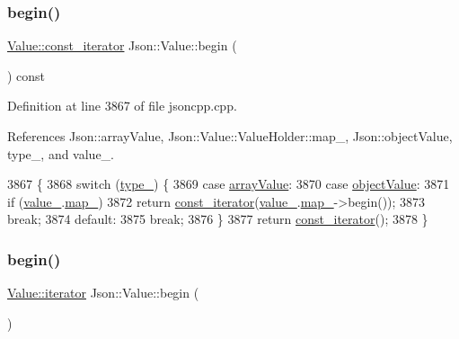 \subsubsection{\texorpdfstring{begin()}{begin()}\hspace{0.1cm}{\footnotesize\ttfamily [1/2]}}
{\footnotesize\ttfamily \hyperlink{class_json_1_1_value_af92282ca92b58b320debd486afb7696a}{Value\+::const\+\_\+iterator} Json\+::\+Value\+::begin (\begin{DoxyParamCaption}{ }\end{DoxyParamCaption}) const}



Definition at line 3867 of file jsoncpp.\+cpp.



References Json\+::array\+Value, Json\+::\+Value\+::\+Value\+Holder\+::map\+\_\+, Json\+::object\+Value, type\+\_\+, and value\+\_\+.


\begin{DoxyCode}
3867                                        \{
3868   \textcolor{keywordflow}{switch} (\hyperlink{class_json_1_1_value_abd222c2536dc88bf330dedcd076d2356}{type\_}) \{
3869   \textcolor{keywordflow}{case} \hyperlink{namespace_json_a7d654b75c16a57007925868e38212b4eadc8f264f36b55b063c78126b335415f4}{arrayValue}:
3870   \textcolor{keywordflow}{case} \hyperlink{namespace_json_a7d654b75c16a57007925868e38212b4eae8386dcfc36d1ae897745f7b4f77a1f6}{objectValue}:
3871     \textcolor{keywordflow}{if} (\hyperlink{class_json_1_1_value_aef578244546212705b9f81eb84d7e151}{value\_}.\hyperlink{union_json_1_1_value_1_1_value_holder_a1e7a5b86d4f52234f55c847ad1ce389a}{map\_})
3872       \textcolor{keywordflow}{return} \hyperlink{class_json_1_1_value_af92282ca92b58b320debd486afb7696a}{const\_iterator}(\hyperlink{class_json_1_1_value_aef578244546212705b9f81eb84d7e151}{value\_}.\hyperlink{union_json_1_1_value_1_1_value_holder_a1e7a5b86d4f52234f55c847ad1ce389a}{map\_}->begin());
3873     \textcolor{keywordflow}{break};
3874   \textcolor{keywordflow}{default}:
3875     \textcolor{keywordflow}{break};
3876   \}
3877   \textcolor{keywordflow}{return} \hyperlink{class_json_1_1_value_af92282ca92b58b320debd486afb7696a}{const\_iterator}();
3878 \}
\end{DoxyCode}
\mbox{\label{class_json_1_1_value_a2d45bb2e68e8f22fe356d7d955ebd3c9}} 
\subsubsection{\texorpdfstring{begin()}{begin()}\hspace{0.1cm}{\footnotesize\ttfamily [2/2]}}
{\footnotesize\ttfamily \hyperlink{class_json_1_1_value_a341cdf2e01f8b3c5b7317aa2f0768c53}{Value\+::iterator} Json\+::\+Value\+::begin (\begin{DoxyParamCaption}{ }\end{DoxyParamCaption})}



